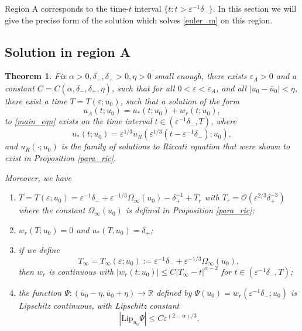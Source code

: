 \documentclass[letterpaper,11pt]{article}
\newcommand{\rmO}{\mathcal{O}}
\newcommand{\eps}{\varepsilon}
\numberwithin{equation}{section}
\theoremstyle{plain}
\newtheorem{Theorem}{Theorem}
\begin{document}
Region A corresponds to the time-$t$ interval $\{ t : t > \eps^{-1}\delta_-\}$. In this section we will give the precise form of the solution which solves \eqref{euler_m} on this region.

\subsection{Solution in region A}

\begin{Theorem}\label{thm:r}
Fix $\alpha>0, \delta_-,\delta_+>0, \eta>0$ small enough, there exists $\eps_A>0$ and a constant $C=C(\alpha,\delta_-,\delta_+,\eta)$, such that for all $0<\eps <\eps_A$, and all $|u_0 - \bar{u}_0|<\eta$, there exist a time $T=T(\eps;u_0)$, such that a solution of the form
\begin{equation}
u_A(t;u_0) = u_*(t; u_0) + w_r(t; u_0),
\end{equation}
to \eqref{main_eqn} exists on the time interval $t \in (\eps^{-1}\delta_-, T)$,
where
\begin{equation}
u_*(t; u_0) = \eps^{1/3}u_R(\eps^{1/3}(t-\eps^{-1}\delta_-); u_0),
\end{equation} and $u_R(\cdot; u_0)$ is the family of solutions to Riccati equation that were shown to exist in Proposition \ref{para_ric}. 

Moreover, we have
\begin{enumerate}[label=\textnormal{(\arabic*)}]
\item \label{thm:r_1}$T=T(\eps;u_0) = \eps^{-1}\delta_-+\eps^{-1/3}\Omega_\infty(u_0)-\delta_+^{-1}+T_r$ with $T_r = \rmO( \eps^{2/3}\delta_+^{-3} )$ where the constant $\Omega_\infty(u_0)$ is defined in Proposition \ref{para_ric};
\item \label{thm:r_2} $w_r(T; u_0) = 0$ and $u_*(T,u_0)=\delta_+$;

\item \label{thm:r_3} if we define  
\begin{equation}\label{def:T_inf}
T_\infty = T_\infty(\eps; u_0) := \eps^{-1}\delta_- + \eps^{-1/3}\Omega_\infty(u_0),
\end{equation}
then $w_r$ is continuous with $|w_r(t; u_0)| \le C|T_\infty-t|^{\alpha-2}$ for $t \in (\eps^{-1}\delta_-, T)$;

\item \label{thm:r_4} the function 
$\Psi: (\bar{u}_0-\eta, \bar{u}_0+\eta) \to \mathbb{R}$ defined by $\Psi(u_0)=  w_r(\eps^{-1}\delta_-; u_0)$ is Lipschitz continuous, with Lipschitz constant 
\[
|\text{Lip}_{u_0}\Psi |\le C\eps^{(2-\alpha)/3}. 
\]
\end{enumerate}
\end{Theorem}
\end{document}
